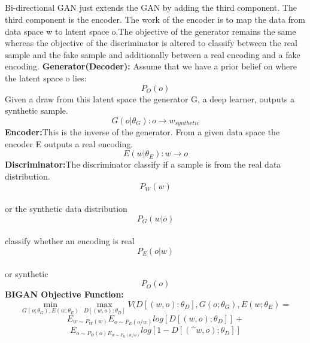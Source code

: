 \documentclass[runningheads]{llncs}
\begin{document}
\subsection{}
Bi-directional GAN just extends the GAN by adding the third component. The third component is the encoder. The work of the encoder is to map the data from data space w to latent space o.The objective of the generator remains the same whereas the objective of the discriminator is altered to classify between the real sample and the fake sample and additionally between a real encoding and a fake encoding.
\newline
\textbf{Generator(Decoder):}
\newline
Assume that we have a prior belief on where the latent space o lies:\[{P_O(o)}\] Given a draw from this latent space the generator G, a deep learner, outputs a synthetic sample.
\[ G(o|\theta_G):o\rightarrow w_{synthetic}\]
\newline
\textbf{Encoder:}This is the inverse of the generator. From a given data space the encoder E outputs a real encoding.\[ E(w|\theta_E):w \rightarrow o\]
\textbf{Discriminator:}The discriminator classify if a sample is from the real data distribution.
\[{P_W(w)}\] \\ or the synthetic data distribution \[P_G(w|o)\]\\ classify whether an encoding is real \[ P_E(o|w)\] \\ or synthetic \[P_O(o) \]
\textbf{BIGAN Objective Function:}
\newline
\begin{equation*}
\min_{G(o;\theta_G),E(w;\theta_E)}  \max_{D[(w,o);\theta_D]}V(D[(w,o):\theta_D],G(o;\theta_G),E(w;\theta_E)=
\end{equation*}
\begin{equation*}
E_{w\sim P_{W}(w)}E_{o\sim P_{E}(o/w)}log[D[(w,o); \theta_D ]]+
\end{equation*}
\begin{equation*}
E_{o\sim P_{O}(o)E_{w\sim P_{G}(w/o)}}log[1-D[(\^{w},o); \theta_D ]]
\end{equation*}
\end{document}
